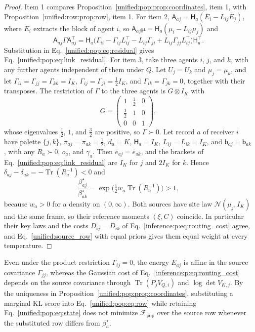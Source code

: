 \documentclass[11pt]{article}
\theoremstyle{definition}
\theoremstyle{remark}
\providecommand{\Tr}{\operatorname{Tr}}
\providecommand{\N}{\mathcal{N}}
\providecommand{\F}{\mathcal{F}}
\begin{document}
\begin{proof}
Item 1 compares Proposition~\ref{unified:pop:prop:coordinates}, item 1, with Proposition~\ref{unified:row:prop:row}, item 1. For item 2, $\mathsf A_{aj}=\mathsf H_a(E_i-L_{ij}E_j)$, where $E_i$ extracts the block of agent $i$, so $\mathsf A_{aj}\boldsymbol\mu=\mathsf H_a(\mu_i-L_{ij}\mu_j)$ and
\[
\mathsf A_{aj}\Gamma\mathsf A_{aj}^\top=\mathsf H_a\bigl(\Gamma_{ii}-\Gamma_{ij}L_{ij}^\top-L_{ij}\Gamma_{ji}+L_{ij}\Gamma_{jj}L_{ij}^\top\bigr)\mathsf H_a^\top.
\]
Substitution in Eq.~\eqref{unified:pop:eq:residual} gives Eq.~\eqref{unified:pop:eq:link_residual}. For item 3, take three agents $i$, $j$, and $k$, with any further agents independent of them under $Q$. Let $U_j=U_k$ and $\mu_j=\mu_k$, and let $\Gamma_{ii}=\Gamma_{jj}=\Gamma_{kk}=I_K$, $\Gamma_{ij}=\Gamma_{ji}=\tfrac12I_K$, and $\Gamma_{ik}=\Gamma_{jk}=0$, together with their transposes. The restriction of $\Gamma$ to the three agents is $G\otimes I_K$ with
\[
G=\begin{pmatrix}1&\tfrac12&0\\\tfrac12&1&0\\0&0&1\end{pmatrix},
\]
whose eigenvalues $\tfrac12$, $1$, and $\tfrac32$ are positive, so $\Gamma\succ0$. Let record $a$ of receiver $i$ have palette $\{j,k\}$, $\pi_{aj}=\pi_{ak}=\tfrac12$, $d_a=K$, $\mathsf H_a=I_K$, $L_{ij}=L_{ik}=I_K$, and $\mathsf b_{aj}=\mathsf b_{ak}$, with any $R_a\succ0$, $o_a$, and $\gamma_a$. Then $\bar e_{aj}=\bar e_{ak}$, and the brackets of Eq.~\eqref{unified:pop:eq:link_residual} are $I_K$ for $j$ and $2I_K$ for $k$. Hence $\delta_{aj}-\delta_{ak}=-\Tr(R_a^{-1})<0$ and
\[
\frac{\beta_{aj}^\star}{\beta_{ak}^\star}=\exp\bigl(\tfrac12w_a\Tr(R_a^{-1})\bigr)>1,
\]
because $w_a>0$ for a density on $(0,\infty)$. Both sources have site law $\N(\mu_j,I_K)$ and the same frame, so their reference moments $(\xi,C)$ coincide. In particular their key laws and the costs $D_{ij}=D_{ik}$ of Eq.~\eqref{inference:p:eq:routing_cost} agree, and Eq.~\eqref{unified:source_row} with equal priors gives them equal weight at every temperature.
\end{proof}

Even under the product restriction $\Gamma_{ij}=0$, the energy $E_{aj}$ is affine in the source covariance $\Gamma_{jj}$, whereas the Gaussian cost of Eq.~\eqref{inference:p:eq:routing_cost} depends on the source covariance through $\Tr(P_jV_{Q,i})$ and $\log\det V_{K,j}$. By the uniqueness in Proposition~\ref{unified:pop:prop:coordinates}, substituting a marginal KL score into Eq.~\eqref{unified:pop:eq:row} while retaining Eq.~\eqref{unified:pop:eq:state} does not minimize $\F_{\mathrm{pop}}$ over the source row whenever the substituted row differs from $\beta_a^\star$.
\end{document}
